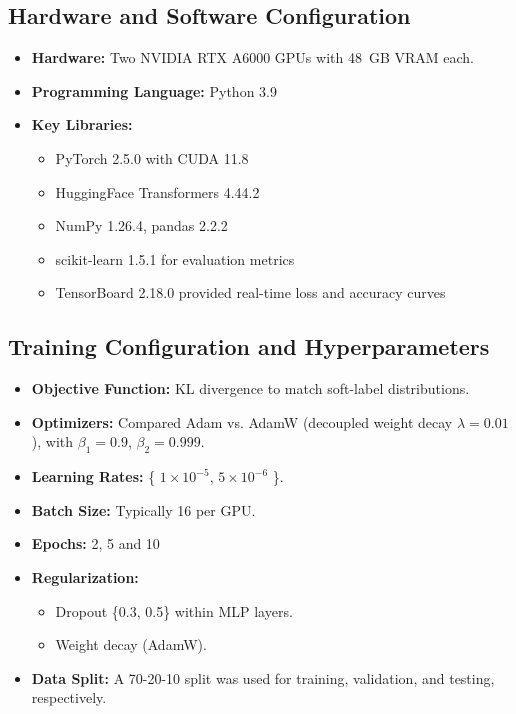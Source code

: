 \subsection*{Hardware and Software Configuration}
\begin{itemize}
    \item \textbf{Hardware:} Two NVIDIA RTX A6000 GPUs with 48~GB VRAM each.
    \item \textbf{Programming Language:} Python 3.9
    \item \textbf{Key Libraries:}
    \begin{itemize}
        \item PyTorch 2.5.0 with CUDA 11.8
        \item HuggingFace Transformers 4.44.2
        \item NumPy 1.26.4, pandas 2.2.2
        \item scikit-learn 1.5.1 for evaluation metrics
        \item TensorBoard 2.18.0 provided real-time loss and accuracy curves
    \end{itemize}
\end{itemize}

\subsection*{Training Configuration and Hyperparameters}

\begin{itemize}
    \item \textbf{Objective Function:} KL divergence to match soft-label distributions.
    \item \textbf{Optimizers:} Compared Adam vs. AdamW (decoupled weight decay $\lambda=0.01$), with $\beta_1=0.9$, $\beta_2=0.999$.
    \item \textbf{Learning Rates:} \{ $1 \times 10^{-5}$, $5 \times 10^{-6}$ \}.
    \item \textbf{Batch Size:} Typically 16 per GPU.
    \item \textbf{Epochs:} 2, 5 and 10
    \item \textbf{Regularization:}
    \begin{itemize}
        \item Dropout \{0.3, 0.5\} within MLP layers.
        \item Weight decay (AdamW).
    \end{itemize}
    \item \textbf{Data Split:} A 70-20-10 split was used for training, validation, and testing, respectively.
\end{itemize}

